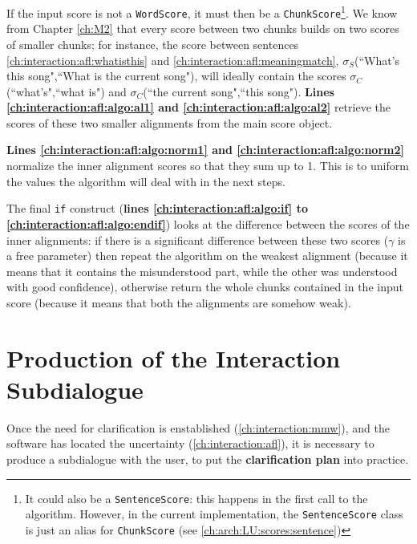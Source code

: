 If the input score is not a \texttt{WordScore}, it must then be a \texttt{ChunkScore}\footnote{It could also be a \texttt{SentenceScore}: this happens in the first call to the algorithm. However, in the current implementation, the \texttt{SentenceScore} class is just an alias for \texttt{ChunkScore} (see \ref{ch:arch:LU:scores:sentence})}. We know from Chapter \ref{ch:M2} that every score between two chunks builds on two scores of smaller chunks; for instance, the score between sentences \ref{ch:interaction:afl:whatisthis} and \ref{ch:interaction:afl:meaningmatch}, $\sigma_S$(``What's this song",``What is the current song"), will ideally contain the scores $\sigma_C$(``what's",``what is") and $\sigma_C$(``the current song",``this song"). \textbf{Lines \ref{ch:interaction:afl:algo:al1} and \ref{ch:interaction:afl:algo:al2}} retrieve the scores of these two smaller alignments from the main score object.

\textbf{Lines \ref{ch:interaction:afl:algo:norm1} and \ref{ch:interaction:afl:algo:norm2}} normalize the inner alignment scores so that they sum up to 1. This is to uniform the values the algorithm will deal with in the next steps.

The final \texttt{if} construct (\textbf{lines \ref{ch:interaction:afl:algo:if} to \ref{ch:interaction:afl:algo:endif}}) looks at the difference between the scores of the inner alignments: if there is a significant difference between these two scores ($\gamma$ is a free parameter) then repeat the algorithm on the weakest alignment (because it means that it contains the misunderstood part, while the other was understood with good confidence), otherwise return the whole chunks contained in the input score (because it means that both the alignments are somehow weak).


\section{Production of the Interaction Subdialogue} \label{ch:interaction:episode}
Once the need for clarification is enstablished (\ref{ch:interaction:mmw}), and the software has located the uncertainty (\ref{ch:interaction:afl}), it is necessary to produce a subdialogue with the user, to put the \textbf{clarification plan} into practice.


